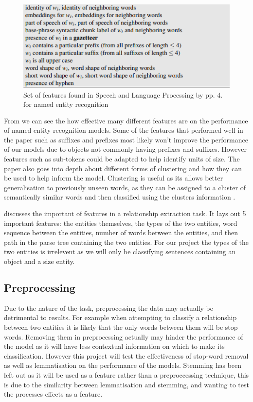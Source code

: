 \documentclass[11pt,oneside]{book}
\begin{document}
\begin{figure}[!htbp]
\centering
\includegraphics[scale=1]{figures/features.png}
\caption{Set of features found in Speech and Language Processing by \cite{reference1} pp. 4. for named entity recognition}
\label{fig:feature_set}
\end{figure}

From \citet{many_features} we can see the how effective many different features are on the performance of named entity recognition models. Some of the features that performed well in the paper such as suffixes and prefixes most likely won't improve the performance of our models due to objects not commonly having prefixes and suffixes. However features such as sub-tokens could be adapted to help identify units of size. The paper also goes into depth about different forms of clustering and how they can be used to help inform the model. Clustering is useful as its allows better generalisation to previously unseen words, as they can be assigned to a cluster of semantically similar words and then classified using the clusters information \citep{phrasecluster}.

\citet{refeatures} discusses the important of features in a relationship extraction task. It lays out 5 important features: the entities themselves, the types of the two entities, word sequence between the entities, number of words between the entities, and then path in the parse tree containing the two entities. For our project the types of the two entities is irrelevent as we will only be classifying sentences containing an object and a size entity.

\subsection{Preprocessing}
Due to the nature of the task, preprocessing the data may actually be detrimental to results. For example when attempting to classify a relationship between two entities it is likely that the only words between them will be stop words. Removing them in preprocessing actually may hinder the performance of the model as it will have less contextual information on which to make its classification. However this project will test the effectiveness of stop-word removal as well as lemmatisation on the performance of the models. Stemming has been left out as it will be used as a feature rather than a preproccessing technique, this is due to the similarity between lemmatisation and stemming, and wanting to test the processes effects as a feature.
\end{document}
